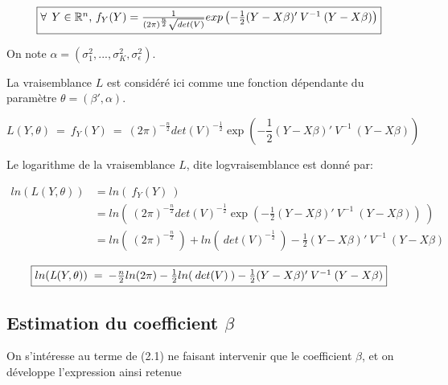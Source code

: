 \documentclass[12pt,fleqn]{book} %
\begin{document}
\begin{equation*}
\fbox{$
\forall\:\: Y \in \mathbb{R}^{n}$, $f_{Y}(Y)=\frac{1}{(2\pi)^{\frac{n}{2}}\sqrt{det(V)}}exp\left(-\frac{1}{2}(Y-X\beta)'\:V^{-1}\:(Y-X\beta)\right) 
$}
\end{equation*}

\vspace{1em}

On note $\alpha=(\sigma_1^2,...,\sigma_K^2,\sigma_{\epsilon}^2)$.


\vspace{1em}

La vraisemblance $L$ est considéré ici comme une fonction dépendante du paramètre $\theta=(\beta',\alpha)$.


\begin{equation*}
\textit{L}(Y,\theta) \:=\:  f_{Y}(Y) \:=\:  (2\pi)^{-\frac{n}{2}} det(V)^{-\frac{1}{2}} \exp\left(-\frac{1}{2}(Y-X\beta)'\:V^{-1}\:(Y-X\beta)\right)
\end{equation*}

\vspace{1em}

Le logarithme de la vraisemblance $L$, dite logvraisemblance est donné par:

\begin{align*}
ln(\textit{L}(Y,\theta)) &= ln(\: f_{Y}(Y) \:)\\
                        &= ln\left(\: (2\pi)^{-\frac{n}{2}} det(V)^{-\frac{1}{2}} \exp\left(-\frac{1}{2}(Y-X\beta)'\:V^{-1}\:(Y-X\beta)\right) \: \right) \\
						&= ln(\:(2\pi)^{-\frac{n}{2}}\:) + ln(\:det(V)^{-\frac{1}{2}}\:) -\frac{1}{2} (Y-X\beta)'\:V^{-1}\:(Y-X\beta) 
\end{align*}


\begin{equation}
\fbox{$
 ln(\textit{L}(Y,\theta)) \;=\: -\frac{n}{2} ln(2\pi) -\frac{1}{2} ln(\:det(V)\:) -\frac{1}{2}  (Y-X\beta)'\:V^{-1}\:(Y-X\beta)
 $}
\end{equation}

\vspace{2em}

\subsection{Estimation du coefficient $\beta$}

\vspace{2em}

On s'intéresse au terme de (2.1) ne faisant intervenir que le coefficient $\beta$, et on développe l'expression ainsi retenue
\end{document}
